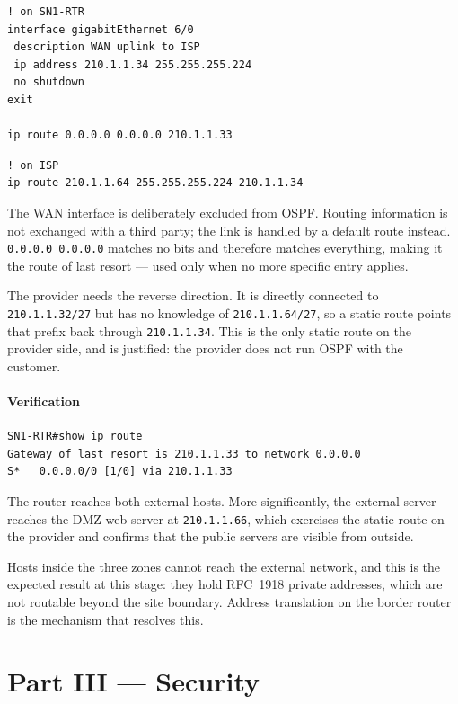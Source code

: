 \documentclass[12pt,a4paper]{article}
\begin{document}
\begin{lstlisting}
! on SN1-RTR
interface gigabitEthernet 6/0
 description WAN uplink to ISP
 ip address 210.1.1.34 255.255.255.224
 no shutdown
exit

ip route 0.0.0.0 0.0.0.0 210.1.1.33
\end{lstlisting}

\begin{lstlisting}
! on ISP
ip route 210.1.1.64 255.255.255.224 210.1.1.34
\end{lstlisting}

The WAN interface is deliberately excluded from OSPF. Routing information is not
exchanged with a third party; the link is handled by a default route instead.
\texttt{0.0.0.0 0.0.0.0} matches no bits and therefore matches everything, making
it the route of last resort --- used only when no more specific entry applies.

The provider needs the reverse direction. It is directly connected to
\texttt{210.1.1.32/27} but has no knowledge of \texttt{210.1.1.64/27}, so a
static route points that prefix back through \texttt{210.1.1.34}. This is the
only static route on the provider side, and is justified: the provider does not
run OSPF with the customer.

\subsection{Verification}

\begin{lstlisting}
SN1-RTR#show ip route
Gateway of last resort is 210.1.1.33 to network 0.0.0.0
S*   0.0.0.0/0 [1/0] via 210.1.1.33
\end{lstlisting}

The router reaches both external hosts. More significantly, the external server
reaches the DMZ web server at \texttt{210.1.1.66}, which exercises the static
route on the provider and confirms that the public servers are visible from
outside.

Hosts inside the three zones cannot reach the external network, and this is the
expected result at this stage: they hold RFC~1918 private addresses, which are
not routable beyond the site boundary. Address translation on the border router
is the mechanism that resolves this.

\newpage
\part*{Part III --- Security}
\end{document}
